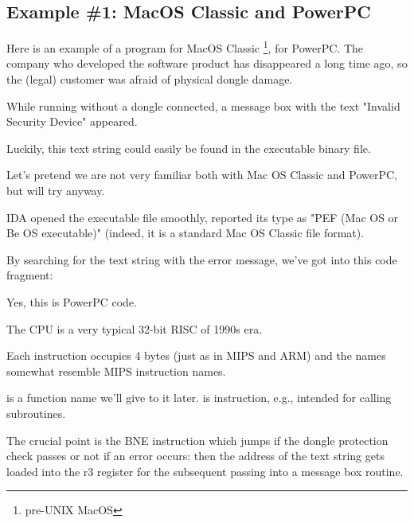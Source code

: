\newcommand{\PPC}{\InSqBrackets{\IT{PowerPC(tm) Microprocessor Family: The Programming Environments for 32-Bit Microprocessors}, (2000)}\footnote{\AlsoAvailableAs \url{http://yurichev.com/mirrors/PowerPC/6xx_pem.pdf}}}

\newcommand{\PPCABI}{[Steve Zucker, SunSoft and Kari Karhi, IBM, \IT{SYSTEM V APPLICATION BINARY INTERFACE: PowerPC Processor Supplement}, (1995)]\footnote{\AlsoAvailableAs \url{http://yurichev.com/mirrors/PowerPC/elfspec_ppc.pdf}}}

\subsection{Example \#1: MacOS Classic and PowerPC}

Here is an example of a program for MacOS Classic
\footnote{pre-UNIX MacOS}, for PowerPC.
The company who developed the software product
has disappeared a long time ago, so the (legal) customer was afraid of physical dongle damage.

While running without a dongle connected, a message box with the text
"Invalid Security Device" appeared.

Luckily, this text string could easily be found in the executable binary file.

Let's pretend we are not very familiar both with Mac OS Classic and PowerPC, but will try anyway.

\ac{IDA} 
opened the executable file smoothly, reported its type as 
"PEF (Mac OS or Be OS executable)" (indeed, it is a standard Mac OS Classic file format).

By searching for the text string with the error message, we've got into this code fragment:



Yes, this is PowerPC code.

The CPU is a very typical 32-bit \ac{RISC} of 1990s era.

Each instruction occupies 4 bytes (just as in MIPS and ARM) and the names somewhat resemble
MIPS instruction names.

 is a function name we'll give to it later.
 is  
instruction, e.g., intended for calling subroutines.

The crucial point is the \ac{BNE} instruction which jumps if the dongle protection check passes 
or not if an error occurs: 
then the address of the text string gets loaded into the r3 register for the subsequent passing into a message box routine.

